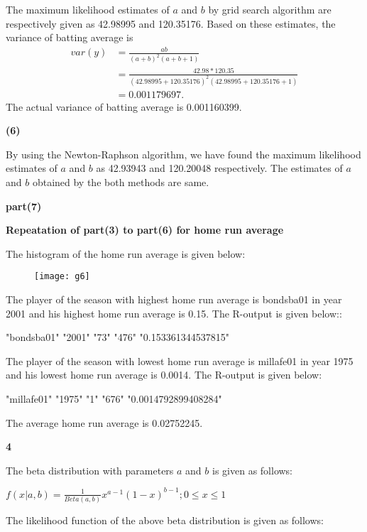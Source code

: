 \documentclass[10pt]{article}
\begin{document}
\begin{newpage}
The maximum likelihood estimates of $a$ and $b$ by grid search algorithm are respectively given as  42.98995 and 120.35176. Based on these estimates, the variance of batting average is
\begin{equation*}
\begin{split}
var(y)&=\frac{ab}{(a+b)^2(a+b+1)}\\
&=\frac{42.98*120.35}{( 42.98995+120.35176)^2( 42.98995+120.35176+1)}\\
&=0.001179697. 
\end{split}
\end{equation*}
The actual variance of batting average is  0.001160399.
\begin{center}
\textbf{(6)}
\end{center}
By using the Newton-Raphson algorithm, we have found the maximum likelihood estimates of $a$ and $b$ as 42.93943 and 120.20048 respectively. The estimates of $a$ and $b$ obtained by the both methods are same.
\begin{center}
\textbf{part(7)}
\end{center}
\begin{center}
\textbf{Repeatation of part(3) to part(6) for home run average}
\end{center}
The histogram of the home run average is given below:
\begin{figure}[h]
\begin{center}
\texttt{[image: g6]}
\end{center}
\end{figure}
The player of the season with highest home run average is bondsba01 in year 2001 and his highest home run average is 0.15. The R-output is given below::

"bondsba01" "2001" "73" "476" "0.153361344537815"

The player of the season with lowest home run average is millafe01 in year 1975 and his lowest home run average is 0.0014. The R-output is given below:

"millafe01" "1975" "1"  "676" "0.0014792899408284"

The average home run average is  0.02752245.
\begin{center}
\textbf{4}
\end{center}
The beta distribution with parameters $a$ and $b$ is given as follows:
\begin{center}
$f(x|a,b)=\frac{1}{Beta(a,b)}x^{a-1}(1-x)^{b-1}; 0\leq x \leq 1$
\end{center}
The likelihood function of the above beta distribution is given as follows:


\end{newpage}
\end{document}
